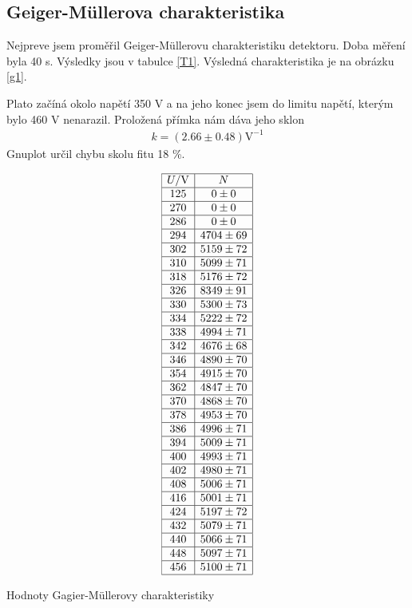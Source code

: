 \documentclass[a4paper,12pt]{article}
\begin{document}
\subsection{Geiger-Müllerova charakteristika}
Nejpreve jsem proměřil Geiger-Müllerovu charakteristiku detektoru. Doba měření byla 40 s.
Výsledky jsou v tabulce \ref{T1}. Výsledná charakteristika je na obrázku \ref{g1}.

Plato začíná okolo napětí 350 V a na jeho konec jsem do limitu napětí, kterým bylo 460 
V nenarazil. Proložená přímka nám dáva jeho sklon
\begin{eqnarray}
k=(2.66\pm 0.48) \mbox{V}^{-1}
\end{eqnarray}
Gnuplot určil chybu skolu fitu 18 \%.

\begin{table}
$$
\begin{array}{|c|c|}
\hline
U/\mbox{V}& N \\ \hline
125&0\pm0\\ \hline
270&0\pm0\\ \hline
286&0\pm0\\ \hline
294&4704\pm69\\ \hline
302&5159\pm72\\ \hline
310&5099\pm71\\ \hline
318&5176\pm72\\ \hline
326&8349\pm91\\ \hline
330&5300\pm73\\ \hline
334&5222\pm72\\ \hline
338&4994\pm71\\ \hline
342&4676\pm68\\ \hline
346&4890\pm70\\ \hline
354&4915\pm70\\ \hline
362&4847\pm70\\ \hline
370&4868\pm70\\ \hline
378&4953\pm70\\ \hline
386&4996\pm71\\ \hline
394&5009\pm71\\ \hline
400&4993\pm71\\ \hline
402&4980\pm71\\ \hline
408&5006\pm71\\ \hline
416&5001\pm71\\ \hline
424&5197\pm72\\ \hline
432&5079\pm71\\ \hline
440&5066\pm71\\ \hline
448&5097\pm71\\ \hline
456&5100\pm71\\ \hline
\end{array}
$$
\caption{Hodnoty Gagier-Müllerovy charakteristiky}
\label{T1}
\end{table}
\end{document}
